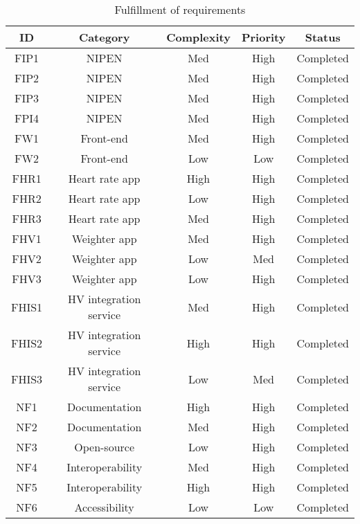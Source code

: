 \begin{table}[h]
\begin{center}
\begin{tabular}{ | c | c | c | c | c | }
  \hline
  \textbf{ID} & \textbf{Category} &\textbf{Complexity} & \textbf{Priority} & \textbf{Status}\\
  \hline\noalign{\smallskip}\noalign{\smallskip}\hline
  FIP1	& NIPEN				& Med	& High & Completed \\
  FIP2	& NIPEN				& Med	& High & Completed \\
  FIP3	& NIPEN				& Med	& High & Completed \\
  FPI4	& NIPEN				& Med	& High & Completed \\
  FW1   & Front-end			& Med	& High & Completed \\
  FW2   & Front-end			& Low	& Low  & Completed \\
  FHR1	& Heart rate app	& High	& High & Completed \\
  FHR2	& Heart rate app	& Low	& High & Completed \\
  FHR3	& Heart rate app	& Med	& High & Completed \\
  FHV1	& Weighter app		& Med	& High & Completed \\
  FHV2	& Weighter app		& Low	& Med  & Completed \\
  FHV3	& Weighter app		& Low	& High & Completed \\

  FHIS1	& HV integration service	& Med   & High & Completed \\
  FHIS2	& HV integration service	& High  & High & Completed \\
  FHIS3	& HV integration service	& Low	& Med  & Completed \\

  NF1 & Documentation		& High 	& High	& Completed \\
  NF2 & Documentation		& Med 	& High	& Completed \\
  NF3 & Open-source			& Low 	& High	& Completed \\
  NF4 & Interoperability	& Med	& High	& Completed \\
  NF5 & Interoperability	& High	& High	& Completed \\
  NF6 & Accessibility		& Low	& Low	& Completed \\

  \hline
\end{tabular}
\end{center}
\caption{Fulfillment of requirements}
\label{table:fulfill-req}
\end{table}

